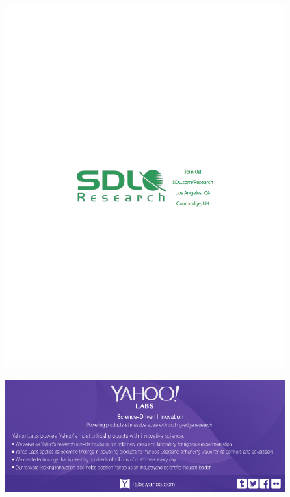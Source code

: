 
\includegraphics[width=4.25in]{content/ads/silver/sdl_research.pdf}

\includegraphics[width=4.25in]{content/ads/bronze/yahoo_labs.pdf}
